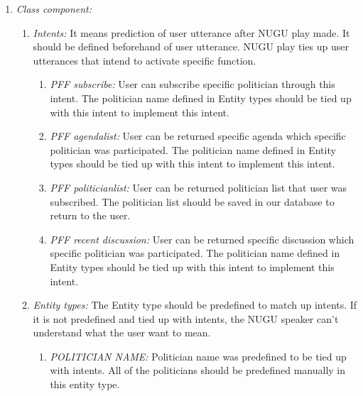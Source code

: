 \documentclass[conference]{IEEEtran}
\begin{document}
\begin{enumerate}
  \item \textit{Class component: }
  \begin{enumerate}
\item \textit {Intents: }  It means prediction of user utterance after NUGU play made. It should be defined beforehand of user utterance. NUGU play ties up user utterances that intend to activate specific function.\
\begin{enumerate}
\item \textit {PFF subscribe: } User can subscribe specific politician through this intent. The politician name defined in Entity types should be tied up with this intent to implement this intent.
\item \textit {PFF agendalist:} User can be returned specific agenda which specific politician was participated. The politician name defined in Entity types should be tied up with this intent to implement this intent.
\item \textit {PFF politicianlist:} User can be returned politician list that user was subscribed. The politician list should be saved in our database to return to the user.
\item \textit {PFF recent discussion:} User can be returned specific discussion which specific politician was participated. The politician name defined in Entity types should be tied up with this intent to implement this intent.\\
 \end{enumerate}

\item \textit {Entity types: }  The Entity type should be predefined to match up intents. If it is not predefined and tied up with intents, the NUGU speaker can’t understand what the user want to mean.\
\begin{enumerate}
\item \textit {POLITICIAN NAME: } Politician name was predefined to be tied up with intents. All of the politicians should be predefined manually in this entity type.
 \end{enumerate}
 

\end{enumerate}
\end{enumerate}
\end{document}
